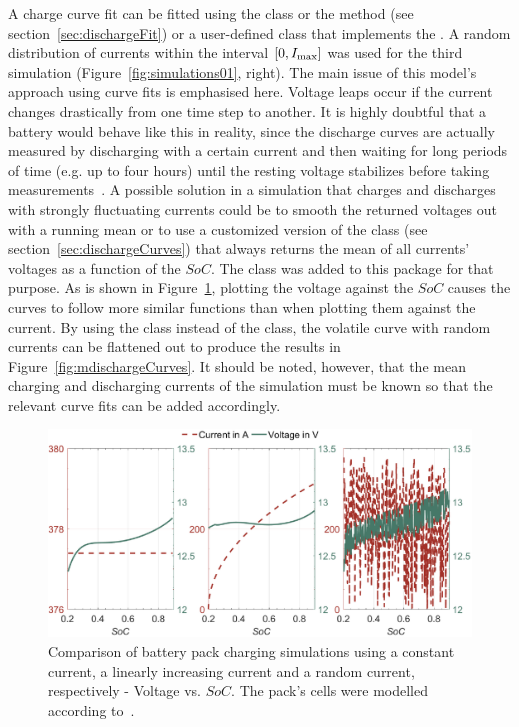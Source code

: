 A charge curve fit can be fitted using the  class or the  method (see section~\ref{sec:dischargeFit}) or a user-defined class that implements the .
A random distribution of currents within the interval $[0, I_\text{max}]$ was used for the third simulation (Figure~\ref{fig:simulations01}, right). The main issue of this model's approach using curve fits is emphasised here. Voltage leaps occur if the current changes drastically from one time step to another. It is highly doubtful that a battery would behave like this in reality, since the discharge curves are actually measured by discharging with a certain current and then waiting for long periods of time (e.g. up to four hours) until the resting voltage stabilizes before taking measurements~\cite{keil_aufbau_2012}. A possible solution in a simulation that charges and discharges with strongly fluctuating currents could be to smooth the returned voltages out with a running mean or to use a customized version of the  class (see section~\ref{sec:dischargeCurves}) that always returns the mean of all currents' voltages as a function of the $SoC$. The  class was added to this package for that purpose. As is shown in Figure~\ref{fig:simulations02}, plotting the voltage against the $SoC$ causes the curves to follow more similar functions than when plotting them against the current. By using the  class instead of the  class, the volatile curve with random currents can be flattened out to produce the results in Figure~\ref{fig:mdischargeCurves}. It should be noted, however, that the mean charging and discharging currents of the simulation must be known so that the relevant curve fits can be added accordingly.
\begin{figure}[t!]
	\captionsetup{type=figure}
	\centering
	\includegraphics[width=\textwidth]{simulations02}
	\caption[Comparison of battery pack charging simulations using a constant current, a linearly increasing current and a random current, respectively - Voltage vs. $SoC$]{Comparison of battery pack charging simulations using a constant current, a linearly increasing current and a random current, respectively - Voltage vs. $SoC$. The pack's cells were modelled according to~\cite{_data_2010}.}
	\label{fig:simulations02}
\end{figure}
